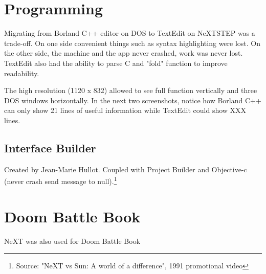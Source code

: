 
\section{Programming}
Migrating from Borland C++ editor on DOS to TextEdit on NeXTSTEP was a trade-off. On one side convenient things such as syntax highlighting were lost. On the other side, the machine and the app never crashed, work was never lost. TextEdit also had the ability to parse C and "fold" function to improve readability.\\
\par
 The high resolution (1120 x 832) allowed to see full function vertically and three DOS windows horizontally. In the next two screenshots, notice how Borland C++ can only show 21 lines of useful information while TextEdit could show XXX lines.\\
\par
{}
\par
{}

\subsection{Interface Builder}
Created by Jean-Marie Hullot. Coupled with Project Builder and Objective-c (never crash send message to null).\footnote{Source: "NeXT vs Sun: A world of a difference", 1991 promotional video}

\par
\section{Doom Battle Book}
NeXT was also used for Doom Battle Book\\
